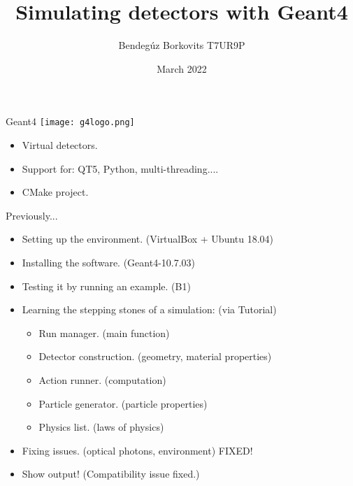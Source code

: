\documentclass[11pt]{beamer}
\author{Bendegúz Borkovits T7UR9P}
\title{Simulating detectors with Geant4}
\institute{Scientific Modeling Computer Laboratory}
\date{March 2022}
\begin{document}
\begin{frame}
\titlepage
\end{frame}

\begin{frame}{Geant4}
    \centering
    \texttt{[image: g4logo.png]}
    \begin{itemize}
        \vspace{0.7 cm}
        \item<tri@1-> Virtual detectors.
        \vspace{0.2 cm}
        \item<tri@1-> Support for: QT5, Python, multi-threading....
        \vspace{0.2 cm}
        \item<tri@1-> CMake project.
    \end{itemize}
    
\end{frame}


\begin{frame}{Previously...}
    \begin{itemize}
        \item<tri@1-> Setting up the environment. (VirtualBox + Ubuntu 18.04)
        \vspace{0.2 cm}
        \item<tri@1-> Installing the software. (Geant4-10.7.03)
        \vspace{0.2 cm}
        \item<tri@1-> Testing it by running an example. (B1)
        \vspace{0.2 cm}
        \item<tri@1-> Learning the stepping stones of a simulation: (via Tutorial)
        \vspace{0.1 cm}
        \begin{itemize}
            \item<square@1-> Run manager. (main function)
            \vspace{0.1 cm}
            \item<square@1-> Detector construction. (geometry, material properties)
            \vspace{0.1 cm}
            \item<square@1-> Action runner. (computation)
            \vspace{0.1 cm}
            \item<square@1-> Particle generator. (particle properties)
            \vspace{0.1 cm}
            \item<square@1-> Physics list. (laws of physics)
        \end{itemize}
        \vspace{0.2 cm}
        \item<tri@1-> Fixing issues. (optical photons, environment) FIXED!
        \vspace{0.2 cm}
        \item<tri@1-> Show output! (Compatibility issue fixed.)
    \end{itemize}
\end{frame}
\end{document}

